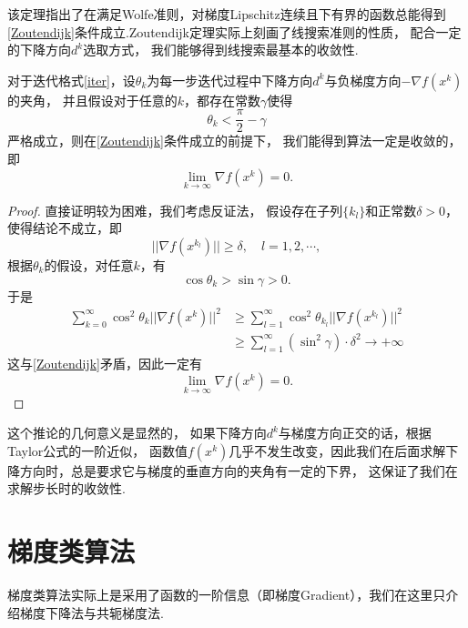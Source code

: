 该定理指出了在满足Wolfe准则，对梯度Lipschitz连续且下有界的函数总能得到\eqref{Zoutendijk}条件成立.Zoutendijk定理实际上刻画了线搜索准则的性质， 配合一定的下降方向$d^k$选取方式， 我们能够得到线搜索最基本的收敛性.
\begin{theorem}[线搜索算法的收敛性]
	对于迭代格式\eqref{iter}，设$\theta_k$为每一步迭代过程中下降方向$d^k$与负梯度方向$-\nabla f(x^k)$的夹角， 并且假设对于任意的$k$，都存在常数$\gamma$使得
	\begin{equation*}
		\theta_k < \frac{\pi}{2} - \gamma
	\end{equation*}
	严格成立，则在\eqref{Zoutendijk}条件成立的前提下， 我们能得到算法一定是收敛的，即
	\begin{equation*}
		\lim\limits_{k\to\infty} \nabla f(x^k) = 0.
	\end{equation*}
\end{theorem}
\begin{proof}
	直接证明较为困难，我们考虑反证法， 假设存在子列$\{k_l\}$和正常数$\delta > 0 $，使得结论不成立，即
	\begin{equation*}
		||\nabla f(x^{k_l})||\geq \delta,\quad l = 1, 2, \cdots,
	\end{equation*}
	根据$\theta_k$的假设，对任意$k$，有
	\begin{equation*}
		\cos\theta_k >\sin\gamma >0.
	\end{equation*}
	于是
	\begin{equation*}
		\begin{split}
			\sum\limits_{k=0}^\infty \cos^2\theta_k ||\nabla f(x^k)||^2  &\geq \sum\limits_{l=1}^\infty \cos^2\theta_{k_l} ||\nabla f(x^{k_l})||^2 \\
			&\geq \sum\limits_{l=1}^\infty (\sin^2\gamma)\cdot \delta^2\rightarrow +\infty
		\end{split}
	\end{equation*}
	这与\eqref{Zoutendijk}矛盾，因此一定有
	\begin{equation*}
		\lim\limits_{k\to\infty} \nabla f(x^k) = 0.
	\end{equation*}
\end{proof}
\begin{note}
	这个推论的几何意义是显然的， 如果下降方向$d^k$与梯度方向正交的话，根据Taylor公式的一阶近似， 函数值$f(x^k)$几乎不发生改变，因此我们在后面求解下降方向时，总是要求它与梯度的垂直方向的夹角有一定的下界， 这保证了我们在求解步长时的收敛性.
\end{note}
\section{梯度类算法}
梯度类算法实际上是采用了函数的一阶信息（即梯度Gradient），我们在这里只介绍梯度下降法与共轭梯度法.
